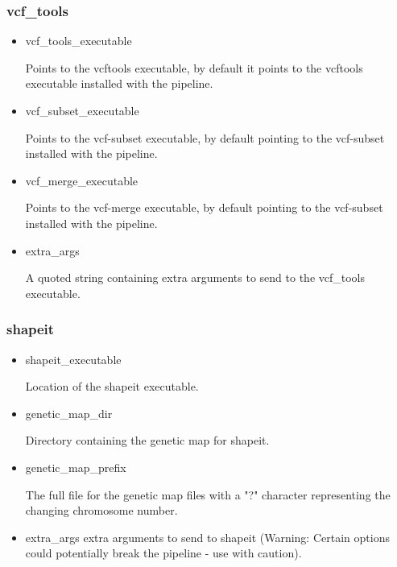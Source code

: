 \documentclass[a4paper,10pt]{article}
\begin{document}
\subsubsection{vcf\_tools}
\begin{itemize}
\item vcf\_tools\_executable 

Points to the vcftools executable, by default it points to the
vcftools executable installed with the pipeline.
\item vcf\_subset\_executable 

Points to the vcf-subset executable, by default pointing to the
vcf-subset installed with the pipeline.
\item vcf\_merge\_executable

Points to the vcf-merge executable, by default pointing to the
vcf-subset installed with the pipeline.
\item extra\_args 

A quoted string containing extra arguments to send to the vcf\_tools executable.
\end{itemize}
\subsubsection{shapeit}
\begin{itemize}
\item shapeit\_executable

Location of the shapeit executable.
\item genetic\_map\_dir 

Directory containing the genetic map for shapeit.
\item genetic\_map\_prefix 

The full file for the genetic map files with a "?" character representing the changing chromosome number.
\item extra\_args 
extra arguments to send to shapeit (Warning: Certain options could
potentially break the pipeline  - use with caution).
\end{itemize}
\end{document}
